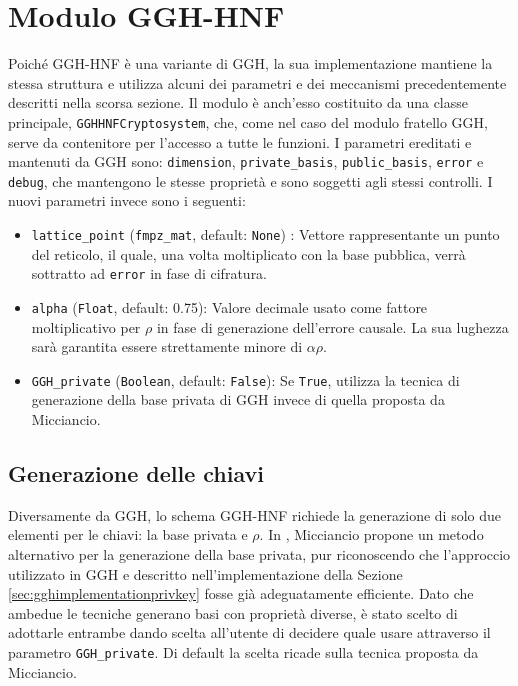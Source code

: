 \section{Modulo GGH-HNF}
\label{sec:moduloggh-hnf}

Poiché GGH-HNF è una variante di GGH, la sua implementazione mantiene la stessa struttura 
e utilizza alcuni dei parametri e dei meccanismi precedentemente descritti nella scorsa sezione.
Il modulo è anch'esso costituito da una classe principale, \texttt{GGHHNFCryptosystem}, che, come nel 
caso del modulo fratello GGH, serve da contenitore per l'accesso a tutte le funzioni.
I parametri ereditati e mantenuti da GGH sono: \texttt{dimension}, \texttt{private\_basis},
\texttt{public\_basis}, \texttt{error} e \texttt{debug}, che mantengono le stesse proprietà
e sono soggetti agli stessi controlli. I nuovi parametri invece sono i seguenti:
\begin{itemize}
    \item \texttt{lattice\_point} (\texttt{fmpz\_mat}, default: \texttt{None}) : 
    Vettore rappresentante un punto del reticolo, il quale, una volta moltiplicato con la
    base pubblica, verrà sottratto ad \texttt{error} in fase di cifratura.
    \item \texttt{alpha} (\texttt{Float}, default: 0.75):
    Valore decimale usato come fattore moltiplicativo per $\rho$ in fase di 
    generazione dell'errore causale. La sua lughezza sarà garantita essere
    strettamente minore di  $\alpha\rho$.
    \item \texttt{GGH\_private} (\texttt{Boolean}, default: \texttt{False}):
    Se \texttt{True}, utilizza la tecnica di generazione della base privata di GGH invece di 
    quella proposta da Micciancio. 
\end{itemize}

\subsection{Generazione delle chiavi}

Diversamente da GGH, lo schema GGH-HNF richiede la generazione di solo due elementi 
per le chiavi: la base privata e $\rho$. In \cite{HNF01}, Micciancio propone un metodo 
alternativo per la generazione della base privata, pur riconoscendo che l'approccio 
utilizzato in GGH e descritto nell'implementazione della Sezione \ref{sec:gghimplementationprivkey} 
fosse già adeguatamente efficiente. Dato che ambedue le tecniche generano basi con 
proprietà diverse, è stato scelto di adottarle entrambe dando scelta all'utente di decidere
quale usare attraverso il parametro \texttt{GGH\_private}. Di default la scelta ricade
sulla tecnica proposta da Micciancio. 

